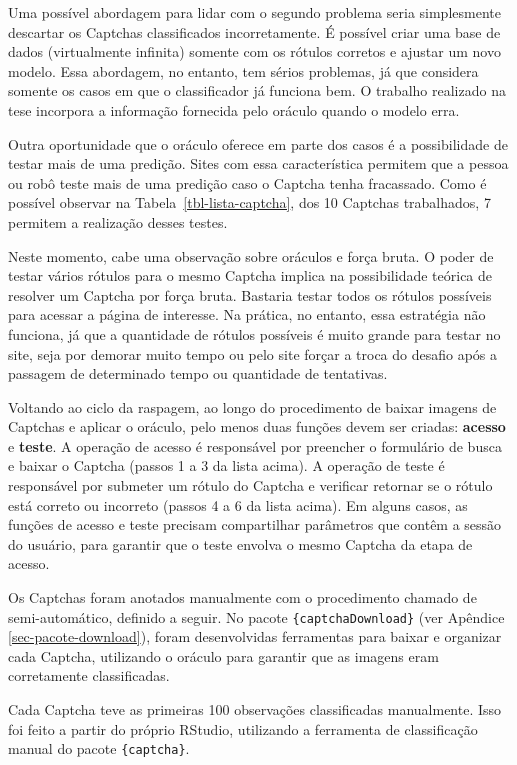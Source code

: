 \documentclass[12pt,twoside,brazilian]{book}
\begin{document}
Uma possível abordagem para lidar com o segundo problema seria
simplesmente descartar os Captchas classificados incorretamente. É
possível criar uma base de dados (virtualmente infinita) somente com os
rótulos corretos e ajustar um novo modelo. Essa abordagem, no entanto,
tem sérios problemas, já que considera somente os casos em que o
classificador já funciona bem. O trabalho realizado na tese incorpora a
informação fornecida pelo oráculo quando o modelo erra.

Outra oportunidade que o oráculo oferece em parte dos casos é a
possibilidade de testar mais de uma predição. Sites com essa
característica permitem que a pessoa ou robô teste mais de uma predição
caso o Captcha tenha fracassado. Como é possível observar na
Tabela~\ref{tbl-lista-captcha}, dos 10 Captchas trabalhados, 7 permitem
a realização desses testes.

Neste momento, cabe uma observação sobre oráculos e força bruta. O poder
de testar vários rótulos para o mesmo Captcha implica na possibilidade
teórica de resolver um Captcha por força bruta. Bastaria testar todos os
rótulos possíveis para acessar a página de interesse. Na prática, no
entanto, essa estratégia não funciona, já que a quantidade de rótulos
possíveis é muito grande para testar no site, seja por demorar muito
tempo ou pelo site forçar a troca do desafio após a passagem de
determinado tempo ou quantidade de tentativas.

Voltando ao ciclo da raspagem, ao longo do procedimento de baixar
imagens de Captchas e aplicar o oráculo, pelo menos duas funções devem
ser criadas: \textbf{acesso} e \textbf{teste}. A operação de acesso é
responsável por preencher o formulário de busca e baixar o Captcha
(passos 1 a 3 da lista acima). A operação de teste é responsável por
submeter um rótulo do Captcha e verificar retornar se o rótulo está
correto ou incorreto (passos 4 a 6 da lista acima). Em alguns casos, as
funções de acesso e teste precisam compartilhar parâmetros que contêm a
sessão do usuário, para garantir que o teste envolva o mesmo Captcha da
etapa de acesso.

Os Captchas foram anotados manualmente com o procedimento chamado de
semi-automático, definido a seguir. No pacote
\texttt{\{captchaDownload\}} (ver Apêndice \ref{sec-pacote-download}),
foram desenvolvidas ferramentas para baixar e organizar cada Captcha,
utilizando o oráculo para garantir que as imagens eram corretamente
classificadas.

Cada Captcha teve as primeiras 100 observações classificadas
manualmente. Isso foi feito a partir do próprio RStudio, utilizando a
ferramenta de classificação manual do pacote \texttt{\{captcha\}}.
\end{document}
